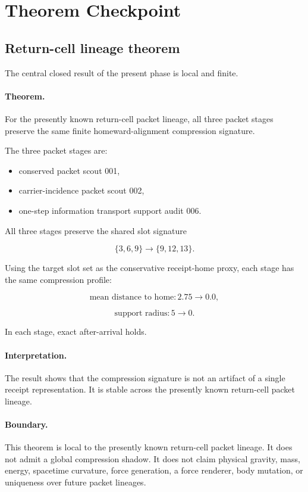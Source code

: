\section{Theorem Checkpoint}

\subsection{Return-cell lineage theorem}

The central closed result of the present phase is local and finite.

\paragraph{Theorem.}
For the presently known return-cell packet lineage, all three packet stages
preserve the same finite homeward-alignment compression signature.

The three packet stages are:

\begin{itemize}
  \item conserved packet scout 001,
  \item carrier-incidence packet scout 002,
  \item one-step information transport support audit 006.
\end{itemize}

All three stages preserve the shared slot signature

\[
\{3,6,9\} \rightarrow \{9,12,13\}.
\]

Using the target slot set as the conservative receipt-home proxy, each stage
has the same compression profile:

\[
\text{mean distance to home}: 2.75 \rightarrow 0.0,
\]

\[
\text{support radius}: 5 \rightarrow 0.
\]

In each stage, exact after-arrival holds.

\paragraph{Interpretation.}
The result shows that the compression signature is not an artifact of a single
receipt representation. It is stable across the presently known return-cell
packet lineage.

\paragraph{Boundary.}
This theorem is local to the presently known return-cell packet lineage. It
does not admit a global compression shadow. It does not claim physical gravity,
mass, energy, spacetime curvature, force generation, a force renderer, body
mutation, or uniqueness over future packet lineages.
